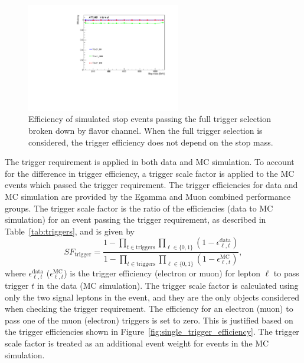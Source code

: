 \begin{figure}[ht]
  \centering
  \includegraphics[width=0.60\textwidth]
    {figs/trigger/EF_e24vhi_medium1_OR_EF_e60_medium1_OR_EF_mu24i_tight_OR_EF_mu36_tight.pdf}
  \caption{Efficiency of simulated stop events passing the full trigger
    selection broken down by flavor channel.
    When the full trigger selection is considered, the trigger efficiency does
    not depend on the stop mass.
  }
  \label{fig:full_trigger_efficiency}
\end{figure}

The trigger requirement is applied in both data and MC simulation.
To account for the difference in trigger efficiency, a trigger scale factor is
applied to the MC events which passed the trigger requirement.
The trigger efficiencies for data and MC simulation are provided by
the Egamma and Muon combined performance groups.
The trigger scale factor is the ratio of the efficiencies (data to MC
simulation) for an event passing the trigger requirement, as described in
Table~\ref{tab:triggers}, and is given by
\begin{equation}
  SF_\mathrm{trigger} =
  \frac{1- \prod_{t \in \mathrm{triggers}}\prod_{\ell \in \{0,1\}}
                 (1-\epsilon_{\ell, t}^\mathrm{data})}
       {1- \prod_{t \in \mathrm{triggers}}\prod_{\ell \in \{0,1\}}
                 (1-\epsilon_{\ell, t}^\mathrm{MC})},
\end{equation}
where $\epsilon_{\ell,t}^\mathrm{data}$ ($\epsilon_{\ell,t}^\mathrm{MC}$) is
the trigger efficiency (electron or muon) for lepton $\ell$ to pass trigger $t$
in the data (MC simulation).
The trigger scale factor is calculated using only the two signal leptons in the
event, and they are the only objects considered when checking the trigger
requirement.
The efficiency for an electron (muon) to pass one of the muon (electron)
triggers is set to zero.
This is justified based on the trigger efficiencies shown in
Figure~\ref{fig:single_trigger_efficiency}.
The trigger scale factor is treated as an additional event weight for events in
the MC simulation.


